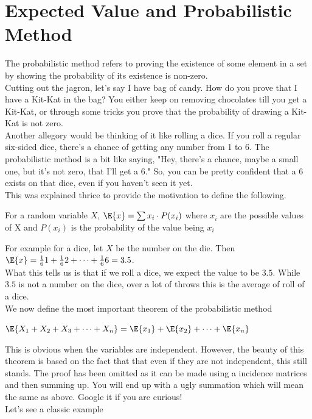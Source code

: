 \section{Expected Value and Probabilistic Method}
The probabilistic method refers to proving the existence of some element in a set by showing the probability of its existence is non-zero.\\
Cutting out the jagron, let's say I have bag of candy. How do you prove that I have a Kit-Kat in the bag? You either keep on removing chocolates till you get a Kit-Kat, or through some tricks you prove that the probability of drawing a Kit-Kat is not zero.\\
Another allegory would be thinking of it like rolling a dice. If you roll a regular six-sided dice, there's a chance of getting any number from 1 to 6. The probabilistic method is a bit like saying, "Hey, there's a chance, maybe a small one, but it's not zero, that I'll get a 6." So, you can be pretty confident that a 6 exists on that dice, even if you haven't seen it yet.\\
This was explained thrice to provide the motivation to define the following.
\begin{defination}
For a random variable $X$,  $\E{x}=\sum {x_i \cdot P(x_i)}$ where $x_i$ are the possible values of X and $P(x_i)$ is the probability of the value being $x_i$
\end{defination}
For example for a dice, let $X$ be the number on the die. Then $\E{x}=\frac{1}{6}1+\frac{1}{6}2+\dots+\frac{1}{6}6 =3.5$.\\
What this tells us is that if we roll a dice, we expect the value to be $3.5$. While $3.5$ is not a number on the dice, over a lot of throws this is the average of roll of a dice.\\
We now define the most important theorem of the probabilistic method
\begin{theorem}
 $\E{X_1+X_2+X_3+\dots +X_n}=\E{x_1}+\E{x_2}+\dots +\E{x_n}$\\
\end{theorem}
This is obvious when the variables are independent. However, the beauty of this theorem is based on the fact that that even if they are not independent, this still stands. The proof has been omitted as it can be made using a incidence matrices and then summing up. You will end up with a ugly summation which will mean the same as above. Google it if you are curious!\\
Let's see a classic example\\
